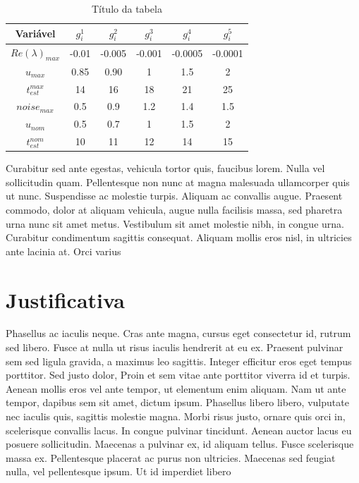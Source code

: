 \documentclass[twoside]{article}
\begin{document}
\begin{multicols}{2}

  \begin{table}
    \centering
    \caption{Título da tabela}
    \begin{tabular}{cc c c c c}
      \hline
      Variável            & $g_i^1$ & $g_i^2$ & $g_i^3$ & $g_i^4$ & $g_i^5$ \\
      \hline
      $Re(\lambda)_{max}$ & -0.01   & -0.005  & -0.001  & -0.0005 & -0.0001 \\
      $u_{max}$           & 0.85    & 0.90    & 1       & 1.5     & 2       \\
      $t_{est}^{max}$     & 14      & 16      & 18      & 21      & 25      \\
      $noise_{max}$       & 0.5     & 0.9     & 1.2     & 1.4     & 1.5     \\
      $u_{nom}$           & 0.5     & 0.7     & 1       & 1.5     & 2       \\
      $t_{est}^{nom}$     & 10      & 11      & 12      & 14      & 15      \\
      \hline
    \end{tabular}
  \end{table}

  Curabitur sed ante egestas, vehicula tortor quis, faucibus lorem. Nulla vel sollicitudin quam. Pellentesque non nunc at magna malesuada ullamcorper quis ut nunc. Suspendisse ac molestie turpis. Aliquam ac convallis augue. Praesent commodo, dolor at aliquam vehicula, augue nulla facilisis massa, sed pharetra urna nunc sit amet metus. Vestibulum sit amet molestie nibh, in congue urna. Curabitur condimentum sagittis consequat. Aliquam mollis eros nisl, in ultricies ante lacinia at. Orci varius 



  \section{Justificativa}
  
    Phasellus ac iaculis neque. Cras ante magna, cursus eget consectetur id, rutrum sed libero. Fusce at nulla ut risus iaculis hendrerit at eu ex. Praesent pulvinar sem sed ligula gravida, a maximus leo sagittis. Integer efficitur eros eget tempus porttitor. Sed justo dolor,
      Proin et sem vitae ante porttitor viverra id et turpis. Aenean mollis eros vel ante tempor, ut elementum enim aliquam. Nam ut ante tempor, dapibus sem sit amet, dictum ipsum. Phasellus libero libero, vulputate nec iaculis quis, sagittis molestie magna. Morbi risus justo, ornare quis orci in, scelerisque convallis lacus. In congue pulvinar tincidunt. Aenean auctor lacus eu posuere sollicitudin. Maecenas a pulvinar ex, id aliquam tellus. Fusce scelerisque massa ex. Pellentesque placerat ac purus non ultricies. Maecenas sed feugiat nulla, vel pellentesque ipsum. Ut id imperdiet libero
      

\end{multicols}
\end{document}
